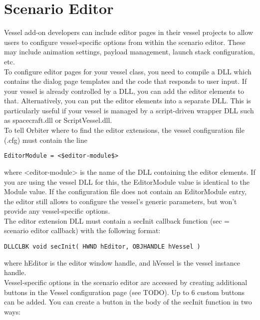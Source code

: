 \documentclass[Orbiter Developer Manual.tex]{subfiles}
\begin{document}
\section{Scenario Editor}
Vessel add-on developers can include editor pages in their vessel projects to allow users to configure vessel-specific options from within the scenario editor. These may include animation settings, payload management, launch stack configuration, etc.\\
To configure editor pages for your vessel class, you need to compile a DLL which contains the dialog page templates and the code that responds to user input. If your vessel is already controlled by a DLL, you can add the editor elements to that. Alternatively, you can put the editor elements into a separate DLL. This is particularly useful if your vessel is managed by a script-driven wrapper DLL such as spacecraft.dll or ScriptVessel.dll.\\
To tell Orbiter where to find the editor extensions, the vessel configuration file (.cfg) must contain the line

\begin{lstlisting}[language=OSFS,mathescape=true]
EditorModule = <$editor-module$>
\end{lstlisting}

\noindent
where <editor-module> is the name of the DLL containing the editor elements. If you are using the vessel DLL for this, the EditorModule value is identical to the Module value. If the configuration file does not contain an EditorModule entry, the editor still allows to configure the vessel’s generic parameters, but won’t provide any vessel-specific options.\\
The editor extension DLL must contain a secInit callback function (sec = scenario editor callback) with the following format:

\begin{lstlisting}
DLLCLBK void secInit( HWND hEditor, OBJHANDLE hVessel )
\end{lstlisting}

\noindent
where hEditor is the editor window handle, and hVessel is the vessel instance handle.\\
Vessel-specific options in the scenario editor are accessed by creating additional buttons in the Vessel configuration page (see TODO). Up to 6 custom buttons can be added. You can create a button in the body of the secInit function in two ways:
\end{document}
